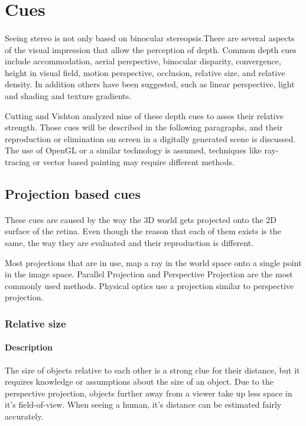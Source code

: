 \section{Cues}
\paragraph{}
Seeing stereo is not only based on binocular stereopsis.There are several aspects of the visual impression that allow the perception of depth. Common depth cues include accommodation, aerial perspective, binocular disparity, convergence, height in visual field, motion perspective, occlusion, relative size, and relative density. In addition others have been suggested, such as linear perspective, light and shading and texture gradients.%

Cutting and Vishton\cite{DepthCues} analyzed nine of these depth cues to asses their relative strength. Those cues will be described in the following paragraphs, and their reproduction or elimination on screen in a digitally generated scene is discussed. The use of OpenGL or a similar technology is assumed, techniques like ray-tracing or vector based painting may require different methods.


\subsection{Projection based cues}
\paragraph{}
These cues are caused by the way the 3D world gets projected onto the 2D surface of the retina.
Even though the reason that each of them exists is the same, the way they are evaluated and their reproduction is different.

Most projections\cite{proj} that are in use, map a ray in the world space onto a single point in the image space. Parallel Projection\cite{parallel} and Perspective Projection\cite{perspective} are the most commonly used methods. Physical optics use a projection similar to perspective projection.


\subsubsection{Relative size}
\paragraph{Description}
The size of objects relative to each other is a strong clue for their distance, but it requires knowledge or assumptions about the size of an object. Due to the perspective projection, objects further away from a viewer take up less space in it's field-of-view. When seeing a human, it's distance can be estimated fairly accurately.

